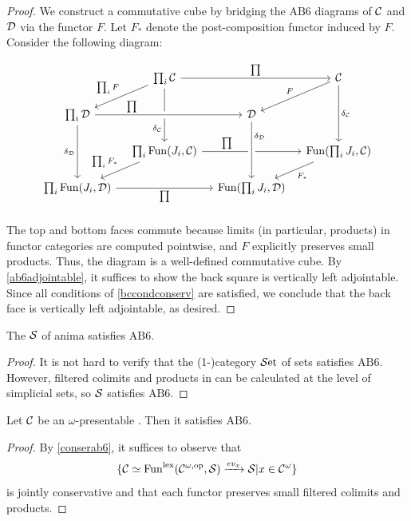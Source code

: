 \documentclass[a4paper,10pt, oneside]{amsart}
\begin{document}
	\begin{proof}
		We construct a commutative cube by bridging the $\mathrm{AB6}$ diagrams of $\mathcal{C}$ and $\mathcal{D}$ via the functor $F$. Let $F_*$ denote the post-composition functor induced by $F$. Consider the following diagram:
		
		$$\begin{tikzcd}[row sep=1.5em, column sep=1em]
			& \prod_i \mcc \arrow[dl, "\prod_i F"'] \arrow[rr, "\prod"] \arrow[dd, "\delta_\mcc"' near end] & & \mcc \arrow[dl, "F"'] \arrow[dd, "\delta_\mcc"] \\
			\prod_i \mcd \arrow[rr, crossing over, "\prod" near start] \arrow[dd, "\delta_\mcd"'] & & \mcd \\
			& \prod_i \funct(J_i, \mcc) \arrow[dl, "\prod_i F_*"'] \arrow[rr, "\prod" near start] & & \funct(\prod_i J_i, \mcc) \arrow[dl, "F_*"] \\
			\prod_i \funct(J_i, \mcd) \arrow[rr, "\prod"'] & & \funct(\prod_i J_i, \mcd) \arrow[from=uu, crossing over, "\delta_\mcd" near start]\\
		\end{tikzcd}$$
		The top and bottom faces commute because limits (in particular, products) in functor categories are computed pointwise, and $F$ explicitly preserves small products. Thus, the diagram is a well-defined commutative cube.  By \cref{ab6adjointable}, it suffices to show the back square is vertically left adjointable.
		Since all conditions of \cref{bccondconserv} are satisfied, we conclude that the back face is vertically left adjointable, as desired. 
	\end{proof}
	\begin{prop}
		The \infcat $\mathcal{S}$ of anima satisfies $\mathrm{AB6}$.
	\end{prop}
	\begin{proof}
	It is not hard to verify that the (1-)category $\mathcal{S}\mathrm{et}$ of sets satisfies $\mathrm{AB6}$. However, filtered colimits and products in \mcs can be calculated at the level of simplicial sets, so $\mathcal{S}$ satisfies $\mathrm{AB6}$.
	\end{proof}
	\begin{cor}\label{compab6}
		Let $\mathcal{C}$ be an $\omega$-presentable \infcat. Then it satisfies $\mathrm{AB6}$.
	\end{cor}
	\begin{proof}
		By \cref{conserab6}, it suffices to observe that $$\{\mathcal{C}\simeq\operatorname{Fun}^{\mathrm{lex}}(\mathcal{C}^{\omega,\mathrm{op}},\mathcal{S})\xrightarrow{ev_x} \mathcal{S} | x\in\mathcal{C}^\omega\}$$ is jointly conservative and that each functor preserves small filtered colimits and products.
	\end{proof}
\end{document}
